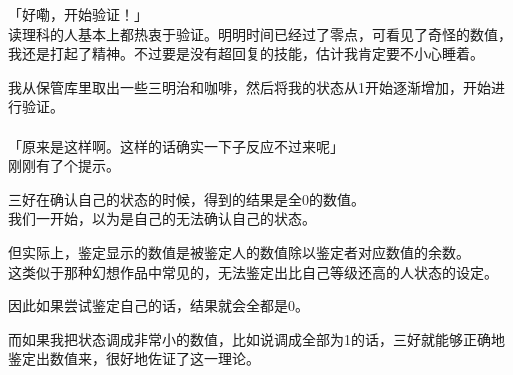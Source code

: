 「好嘞，开始验证！」\\

读理科的人基本上都热衷于验证。明明时间已经过了零点，可看见了奇怪的数值，我还是打起了精神。不过要是没有超回复的技能，估计我肯定要不小心睡着。

我从保管库里取出一些三明治和咖啡，然后将我的状态从1开始逐渐增加，开始进行验证。\\

\sqsplit\\

「原来是这样啊。这样的话确实一下子反应不过来呢」\\

刚刚有了个提示。

三好在确认自己的状态的时候，得到的结果是全0的数值。\\

我们一开始，以为是自己的无法确认自己的状态。

但实际上，鉴定显示的数值是被鉴定人的数值除以鉴定者对应数值的余数。\\

这类似于那种幻想作品中常见的，无法鉴定出比自己等级还高的人状态的设定。

因此如果尝试鉴定自己的话，结果就会全都是0。

而如果我把状态调成非常小的数值，比如说调成全部为1的话，三好就能够正确地鉴定出数值来，很好地佐证了这一理论。\\

